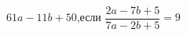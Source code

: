 \begin{ex}[type=calculate_expression]
	\begin{condition}
		\( 61a-11b+50 \),\quad если \( \dfrac{2a-7b+5}{7a-2b+5}=9 \)
	\end{condition}
\end{ex}